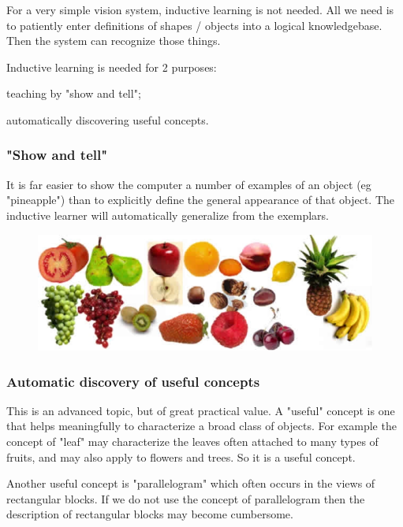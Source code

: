 For a very simple vision system, inductive learning is not needed. All we need is to  patiently enter  definitions of shapes / objects into a logical knowledgebase. Then the system can recognize those things. 

Inductive learning is needed for 2 purposes:
\begin{compactenum-}
	\item  teaching by "show and tell";
	\item  automatically discovering useful concepts.
\end{compactenum-}

\subsubsection{"Show and tell"}

It is far easier to show the computer a number of examples of an object (eg "pineapple") than to explicitly define the general appearance of that object. The inductive learner will automatically generalize from the exemplars.

\begin{figure}[H]
\centering
\includegraphics[scale=0.7]{Fruits.png}
\end{figure}

\subsubsection{Automatic discovery of useful concepts}

This is an advanced topic, but of great practical value. A "useful" concept is one that helps meaningfully to characterize a broad class of objects. For example the concept of "leaf" may characterize the leaves often attached to many types of fruits, and may also apply to flowers and trees. So it is a useful concept.

Another useful concept is "parallelogram" which often occurs in the views of rectangular blocks. If we do not use the concept of parallelogram then the description of rectangular blocks may become cumbersome.

